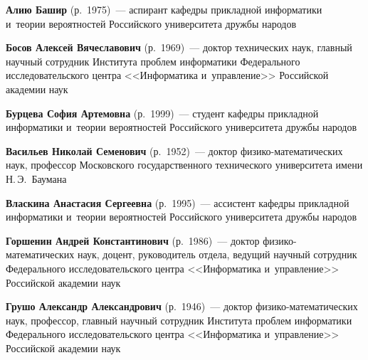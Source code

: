 \begin{multicols}{2}


\noindent
\textbf{Алию Башир} (р.\ 1975)~--- аспирант кафедры прикладной информатики и~тео\-рии вероятностей Российского университета друж\-бы народов

\vspace*{4pt}

\noindent
\textbf{Босов Алексей Вячеславович} (р.\ 1969)~--- 
доктор технических наук, главный научный сотрудник Института проб\-лем информатики Федерального исследовательского цент\-ра 
<<Информатика и~управ\-ле\-ние>> Российской академии наук

\vspace*{4pt}

\noindent
\textbf{Бурцева София Артемовна} (р.\ 1999)~--- студент ка\-фед\-ры прикладной информатики и~тео\-рии вероятностей Российского университета друж\-бы народов

\vspace*{4pt}

\noindent
\textbf{Васильев Николай Семенович} (р.\ 1952)~--- 
доктор фи\-зи\-ко-ма\-те\-ма\-ти\-че\-ских наук, профессор Московского государственного технического университета имени Н.\,Э.~Баумана

\vspace*{4pt}

\noindent
\textbf{Власкина Анастасия Сергеевна} (р.\ 1995)~--- 
ассистент кафедры прикладной информатики и~тео\-рии вероятностей Российского университета друж\-бы на\-родов

\vspace*{4pt}

\noindent
\textbf{Горшенин Андрей Константинович} (р.\ 1986)~--- доктор фи\-зи\-ко-ма\-те\-ма\-ти\-че\-ских наук, 
доцент, руководитель отдела, ведущий научный сотрудник Федерального исследовательского цент\-ра <<\mbox{Информатика} и~управ\-ле\-ние>> Российской академии наук

\vspace*{4pt}


\noindent
\textbf{Грушо Александр Александрович} (р.\ 1946)~--- доктор фи\-зи\-ко-ма\-те\-ма\-ти\-че\-ских наук, 
профессор, главный научный сотрудник Института проб\-лем информатики Федерального исследовательского цент\-ра <<Информатика и~управ\-ле\-ние>>
 Российской академии наук

\vspace*{4pt}


\end{multicols}

